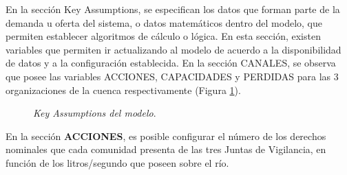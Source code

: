 \documentclass[]{article}
\begin{document}
\begin{itemize}
En la sección Key Assumptions, se especifican los datos que forman parte de la demanda u oferta del sistema, o datos matemáticos dentro del modelo, que permiten establecer algoritmos de cálculo o lógica. En esta sección, existen variables que permiten ir actualizando al modelo de acuerdo a la disponibilidad de datos y a la configuración establecida. En la sección CANALES, se observa que posee las variables ACCIONES, CAPACIDADES y PERDIDAS para las 3 organizaciones de la cuenca respectivamente (Figura \ref{etiqueta_figura5}).

\begin{figure}[H]
\begin{center}
\caption{\textit{Key Assumptions del modelo}.}
\label{etiqueta_figura5}
\end{center}
\end{figure}





En la sección \textbf{ACCIONES}, es posible configurar el número de los derechos nominales que cada comunidad presenta de las tres Juntas de Vigilancia, en función de los litros/segundo que poseen sobre el río.


\end{itemize}
\end{document}
